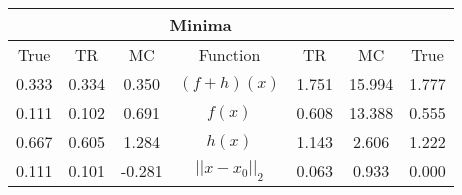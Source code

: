 \begin{tabular}{| c |c |c || c |c |c |c |}
    \hline
    \rowcolor[gray]{0.9}
\multicolumn{3}{|c|}{Parameters} & \multicolumn{4}{|c|}{Minima}\\ \hline True & TR & MC  & Function & TR & MC & True \\
    \hline
  \rowcolor[gray]{0.7}
  0.333 & 0.334 & 0.350   & $ (f + h)(x) $ & 1.751 & 15.994 & 1.777 \\
  \rowcolor[gray]{0.8}
  0.111 & 0.102 & 0.691   & $ f(x) $ & 0.608 & 13.388 & 0.555 \\
  \rowcolor[gray]{0.7}
  0.667 & 0.605 & 1.284   & $ h(x) $ & 1.143 & 2.606 & 1.222 \\
  \rowcolor[gray]{0.8}
  0.111 & 0.101 & -0.281   & $ ||x - x_0||_2 $ & 0.063 & 0.933 & 0.000 \\
\end{tabular}
